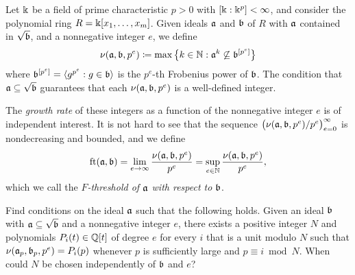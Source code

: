 \documentclass[11pt]{amsart}
\begin{document}
Let $\Bbbk$ be a field of prime characteristic $p>0$ with $[\Bbbk:\Bbbk^p] < \infty$, and consider the polynomial ring $R = \Bbbk[x_1, \ldots, x_m]$.  Given ideals $\mathfrak{a}$ and $\mathfrak{b}$ of $R$ with ${\mathfrak{a}}$ contained in $\sqrt {\mathfrak{b}}$, and a nonnegative integer $e$, we define
%
\[\nu(\mathfrak{a},\mathfrak{b},p^e) \coloneqq \max\big\{k\in \mathbb{N} : \mathfrak{a}^{k} \not\subseteq \mathfrak{b}^{[p^e]}\big\}\]
%
where $\mathfrak{b}^{[p^e]} = \langle g^{p^e} : g \in \mathfrak{b} \rangle$ is the $p^e$-th Frobenius power of $\mathfrak{b}$.
The condition that $\mathfrak{a} \subseteq \sqrt {\mathfrak{b}}$ guarantees that each $\nu(\mathfrak{a}, \mathfrak{b}, p^e)$ is a well-defined integer.

The \emph{growth rate} of these integers as a function of the nonnegative integer $e$ is of independent interest.
It is not hard to see that the sequence $\big(\nu(\mathfrak{a},\mathfrak{b},p^e)/p^e\big)_{e=0}^{\infty}$ is nondecreasing and bounded,  and we define
\[ \operatorname{ft}(\mathfrak{a}, \mathfrak{b}) = \lim_{e \to \infty} \frac{\nu(\mathfrak{a}, \mathfrak{b}, p^e)}{p^e}  = \sup_{e\in \mathbb{N}} \frac{\nu(\mathfrak{a},\mathfrak{b},p^e)}{p^e}, \]
which we call the \emph{$F$-threshold of $\mathfrak{a}$ with respect to $\mathfrak{b}$}.




\begin{problem}
   Find conditions on the ideal $\mathfrak{a}$ such that the following holds.
   Given an ideal $\mathfrak{b}$ with $\mathfrak{a} \subseteq \sqrt {\mathfrak{b}}$ and a nonnegative integer $e$, there exists a positive integer $N$ and polynomials $P_i(t) \in \mathbb{Q}[t]$ of degree $e$ for every $i$ that is a unit modulo $N$ such that $\nu(\mathfrak{a}_p, \mathfrak{b}_p, p^e) = P_i(p)$ whenever $p$ is sufficiently large and $p \equiv i \bmod N$.
   When could $N$ be chosen independently of $\mathfrak{b}$ and $e$?
\end{problem}


%
\end{document}
